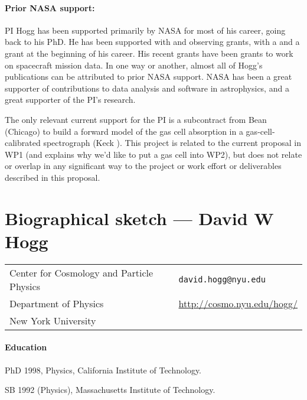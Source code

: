 \documentclass[12pt]{article}
\begin{document}
\paragraph{Prior NASA support:}
PI Hogg has been supported primarily by NASA for most of his career, going back to his PhD.
He has been supported with  and  observing grants, with a  and a  grant at the beginning of his career.
His recent grants have been  grants to work on spacecraft mission data.
In one way or another, almost all of Hogg's publications can be attributed to prior NASA support.
NASA has been a great supporter of contributions to data analysis and software in astrophysics, and a great supporter of the PI's research.

The only relevant current support for the PI is a subcontract from Bean (Chicago) to build a forward model of the gas cell absorption in a gas-cell-calibrated spectrograph (Keck ).
This project is related to the current proposal in WP1 (and explains why we'd like to put a gas cell into WP2), but does not relate or overlap in any significant way to the project or work effort or deliverables described in this proposal.

\clearpage
\section*{Biographical sketch --- David W Hogg}

\setlength{\tabcolsep}{0em}
\begin{tabular}{lll}
Center for Cosmology and Particle Physics & \hspace{6em} & \texttt{david.hogg@nyu.edu} \\
Department of Physics                     & & \url{http://cosmo.nyu.edu/hogg/} \\
New York University                       & & 
\end{tabular}

\paragraph{Education}
\begin{list}{}{\hogglist}
\item
PhD 1998, Physics, California Institute of Technology.
\item
SB 1992 (Physics), Massachusetts Institute of Technology.
\end{list}
\end{document}
